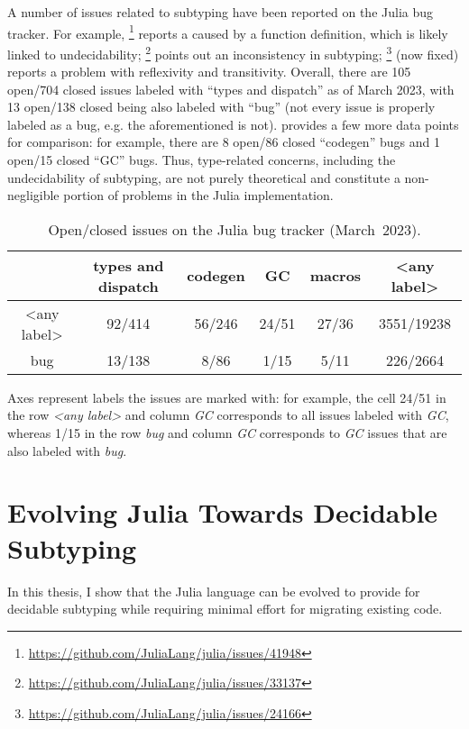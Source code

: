 A number of issues related to subtyping have been reported
on the Julia bug tracker. For example,
\href{https://github.com/JuliaLang/julia/issues/41948}{}\footnote{
    \url{https://github.com/JuliaLang/julia/issues/41948}
} reports a  caused by a function definition,
which is likely linked to undecidability;
\href{https://github.com/JuliaLang/julia/issues/33137}{}\footnote{
    \url{https://github.com/JuliaLang/julia/issues/33137}
} points out an inconsistency in subtyping; %
\href{https://github.com/JuliaLang/julia/issues/24166}{}\footnote{
    \url{https://github.com/JuliaLang/julia/issues/24166} 
} (now fixed) reports a problem with reflexivity and transitivity.
Overall, there are 105 open/704 closed issues labeled with ``types and
dispatch'' as of March 2023,
with 13 open/138 closed being also labeled with ``bug''
(not every issue is properly labeled as a bug,
e.g. the aforementioned
\href{https://github.com/JuliaLang/julia/issues/24166}{} is not).
 provides a few more data points for comparison:
for example, there are 8 open/86 closed ``codegen'' bugs
and 1 open/15 closed ``GC'' bugs.
Thus, type-related concerns, including the undecidability of subtyping,
are not purely theoretical and
constitute a non-negligible portion of problems in the Julia implementation.

\begin{table}[t]
\begin{threeparttable}
\centering\footnotesize
\begin{tabular}{c|ccccc}
 & types and dispatch & codegen & GC & macros & <any label> \\
\midrule
<any label> &
  92/414 & 56/246 & 24/51 & 27/36 & 3551/19238 \\
bug &
  13/138 & 8/86 & 1/15 & 5/11 & 226/2664
\end{tabular}
\caption{Open/closed issues on the Julia bug tracker
(March~2023).}\label{tab:julia-issues-stats}
\begin{tablenotes}[para]
Axes represent labels the issues are marked with: for example, the cell
24/51 in the row \emph{<any label>} and column \emph{GC} corresponds to all
issues labeled with \emph{GC}, whereas 1/15 in the row \emph{bug} and column 
\emph{GC} corresponds to \emph{GC} issues that are also labeled with \emph{bug}.
\end{tablenotes}
\end{threeparttable}
\end{table}

\section{Evolving Julia Towards Decidable Subtyping}

In this thesis, I show that
the Julia language can be evolved to provide for decidable subtyping while
requiring minimal effort for migrating existing code.

